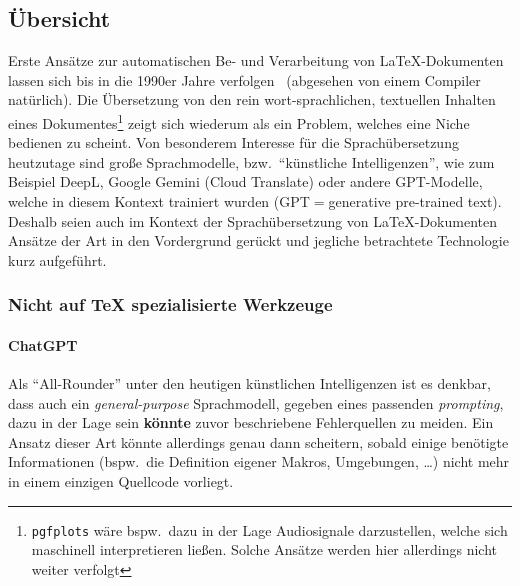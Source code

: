 \begin{comment}
\subsubsection{Durchführung}
\subsubsection{Auswertung}
\subsection{Grenzen der Lösungen}%
\subsection{Takeaways}%
\end{comment}
\subsection{Übersicht}
Erste Ansätze zur automatischen Be- und Verarbeitung von \LaTeX{}-Dokumenten lassen sich bis in die 1990er Jahre verfolgen~\cite{catholicUniversityOfAmerica:peterWilson1997:aLaTeXtoXautotagger} (abgesehen von einem Compiler natürlich). Die Übersetzung von den rein wort-sprachlichen, textuellen Inhalten eines Dokumentes\footnote{\texttt{pgfplots} wäre bspw.\ dazu in der Lage Audiosignale darzustellen, welche sich maschinell interpretieren ließen. Solche Ansätze werden hier allerdings nicht weiter verfolgt} zeigt sich wiederum als ein Problem, welches eine Niche bedienen zu scheint. Von besonderem Interesse für die Sprachübersetzung heutzutage sind große Sprachmodelle, bzw.\ \enquote{künstliche Intelligenzen}, wie zum Beispiel DeepL, Google Gemini (Cloud Translate) oder andere GPT-Modelle, welche in diesem Kontext trainiert wurden (GPT$=$generative pre-trained text). Deshalb seien auch im Kontext der Sprachübersetzung von \LaTeX{}-Dokumenten Ansätze der Art in den Vordergrund gerückt und jegliche betrachtete Technologie kurz aufgeführt.

\subsubsection{Nicht auf \TeX{} spezialisierte Werkzeuge}
\paragraph*{ChatGPT}\par
Als \enquote{All-Rounder} unter den heutigen künstlichen Intelligenzen ist es denkbar, dass auch ein \textit{general-purpose} Sprachmodell, gegeben eines passenden \textit{prompting}, dazu in der Lage sein \textbf{könnte} zuvor beschriebene Fehlerquellen zu meiden. Ein Ansatz dieser Art könnte allerdings genau dann scheitern, sobald einige benötigte Informationen (bspw.\ die Definition eigener Makros, Umgebungen, \ldots) nicht mehr in einem einzigen Quellcode vorliegt.%

